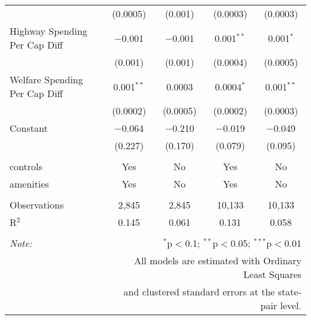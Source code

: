 \begin{table}[!htbp]
\begin{tabular}{@{\extracolsep{5pt}}lcccc}
  & (0.0005) & (0.001) & (0.0003) & (0.0003) \\ 
  Highway Spending Per Cap Diff & $-$0.001 & $-$0.001 & 0.001$^{**}$ & 0.001$^{*}$ \\ 
  & (0.001) & (0.001) & (0.0004) & (0.0005) \\ 
  Welfare Spending Per Cap Diff & 0.001$^{**}$ & 0.0003 & 0.0004$^{*}$ & 0.001$^{**}$ \\ 
  & (0.0002) & (0.0005) & (0.0002) & (0.0003) \\ 
  Constant & $-$0.064 & $-$0.210 & $-$0.019 & $-$0.049 \\ 
  & (0.227) & (0.170) & (0.079) & (0.095) \\ 
 \hline \\[-1.8ex] 
controls & Yes & No & Yes & No \\ 
amenities & Yes & No & Yes & No \\ 
\hline \\[-1.8ex] 
Observations & 2,845 & 2,845 & 10,133 & 10,133 \\ 
R$^{2}$ & 0.145 & 0.061 & 0.131 & 0.058 \\ 
\hline 
\hline \\[-1.8ex] 
\textit{Note:}  & \multicolumn{4}{r}{$^{*}$p$<$0.1; $^{**}$p$<$0.05; $^{***}$p$<$0.01} \\ 
 & \multicolumn{4}{r}{All models are estimated with Ordinary Least Squares} \\ 
 & \multicolumn{4}{r}{and clustered standard errors at the state-pair level.} \\ 
\end{tabular} 
\end{table} 
